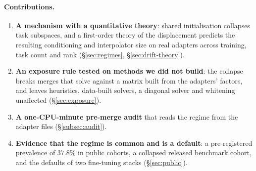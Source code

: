 \paragraph{Contributions.}
\begin{enumerate}[itemsep=2pt,topsep=2pt]
\item \textbf{A mechanism with a quantitative theory}: shared initialisation
  collapses task subspaces, and a first-order theory of the displacement
  predicts the resulting conditioning and interpolator size on real adapters
  across training, task count and rank (\S\ref{sec:regimes},
  \S\ref{sec:drift-theory}).
\item \textbf{An exposure rule tested on methods we did not build}: the
  collapse breaks merges that solve against a matrix built from the adapters'
  factors, and leaves heuristics, data-built solvers, a diagonal solver and
  whitening unaffected (\S\ref{sec:exposure}).
\item \textbf{A one-CPU-minute pre-merge audit} that reads the regime from the
  adapter files (\S\ref{subsec:audit}).
\item \textbf{Evidence that the regime is common and is a default}: a
  pre-registered prevalence of $37.8\%$ in public cohorts, a collapsed released
  benchmark cohort, and the defaults of two fine-tuning stacks
  (\S\ref{sec:public}).
\end{enumerate}
